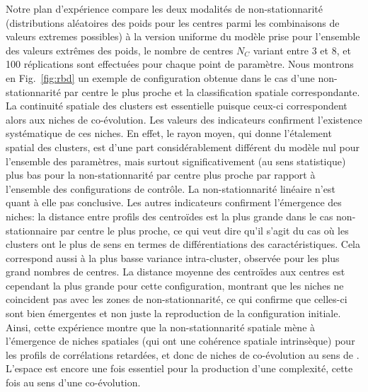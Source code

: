 \documentclass[11pt]{article}
\begin{document}
Notre plan d'expérience compare les deux modalités de non-stationnarité (distributions aléatoires des poids pour les centres parmi les combinaisons de valeurs extremes possibles) à la version uniforme du modèle prise pour l'ensemble des valeurs extrêmes des poids, le nombre de centres $N_C$ variant entre 3 et 8, et 100 réplications sont effectuées pour chaque point de paramètre. Nous montrons en Fig.~\ref{fig:rbd} un exemple de configuration obtenue dans le cas d'une non-stationnarité par centre le plus proche et la classification spatiale correspondante. La continuité spatiale des clusters est essentielle puisque ceux-ci correspondent alors aux niches de co-évolution. Les valeurs des indicateurs confirment l'existence systématique de ces niches. En effet, le rayon moyen, qui donne l'étalement spatial des clusters, est d'une part considérablement différent du modèle nul pour l'ensemble des paramètres, mais surtout significativement (au sens statistique) plus bas pour la non-stationnarité par centre plus proche par rapport à l'ensemble des configurations de contrôle. La non-stationnarité linéaire n'est quant à elle pas conclusive. Les autres indicateurs confirment l'émergence des niches: la distance entre profils des centroïdes est la plus grande dans le cas non-stationnaire par centre le plus proche, ce qui veut dire qu'il s'agit du cas où les clusters ont le plus de sens en termes de différentiations des caractéristiques. Cela correspond aussi à la plus basse variance intra-cluster, observée pour les plus grand nombres de centres. La distance moyenne des centroïdes aux centres est cependant la plus grande pour cette configuration, montrant que les niches ne coincident pas avec les zones de non-stationnarité, ce qui confirme que celles-ci sont bien émergentes et non juste la reproduction de la configuration initiale. Ainsi, cette expérience montre que la non-stationnarité spatiale mène à l'émergence de niches spatiales (qui ont une cohérence spatiale intrinsèque) pour les profils de corrélations retardées, et donc de niches de co-évolution au sens de \cite{raimbault2018caracterisation}. L'espace est encore une fois essentiel pour la production d'une complexité, cette fois au sens d'une co-évolution.







\end{document}
